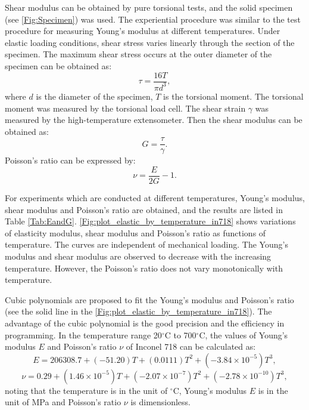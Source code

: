Shear modulus can be obtained by pure torsional tests, and the solid specimen (see \ref{Fig:Specimen}) was used.
The experiential procedure was similar to the test procedure for measuring Young's modulus at different temperatures.
Under elastic loading conditions, shear stress varies linearly through the section of the specimen.
The maximum shear stress occurs at the outer diameter of the specimen can be obtained as:
\begin{equation}
\tau=\frac{{16T}}{\pi d^3},
\end{equation}
where $d$ is the diameter of the specimen, $T$ is the torsional moment.
The torsional moment was measured by the torsional load cell.
The shear strain $\gamma$ was measured by the high-temperature extensometer.
Then the shear modulus can be obtained as:
\begin{equation}
G=\frac{\tau}{\gamma}.
\end{equation}
Poisson's ratio can be expressed by:
\begin{equation}
\nu  = \frac{E}{{2G}} - 1.
\end{equation}

For experiments which are conducted at different temperatures, Young's modulus, shear modulus and Poisson's ratio are obtained, and the results are listed in Table \ref{Tab:EandG}.
\ref{Fig:plot_elastic_by_temperature_in718} shows variations of elasticity modulus, shear modulus and Poisson's ratio as functions of temperature. The curves are independent of mechanical loading. The Young's modulus and shear modulus are observed to decrease with the increasing temperature. However, the Poisson's ratio does not vary monotonically with temperature.

Cubic polynomials are proposed to fit the Young's modulus and Poisson's ratio (see the solid line in the \ref{Fig:plot_elastic_by_temperature_in718}).
The advantage of the cubic polynomial is the good precision and the efficiency in programming.
In the temperature range 20$^{\circ}$C to 700$^{\circ}$C, the values of Young's modulus $E$ and Poisson's ratio $\nu$ of Inconel 718 can be calculated as:
\begin{equation}
E=206308.7+(-51.20)T+(0.0111)T^2+(-3.84\times10^{-5})T^3,
\label{Equ:polynomial_of_E}
\end{equation}
\begin{equation}
\nu=0.29+(1.46\times10^{-5})T+(-2.07\times10^{-7})T^2+(-2.78\times10^{-10})T^3,
\label{Equ:polynomial_of_nu}
\end{equation}
noting that the temperature is in the unit of $^\circ$C, Young's modulus $E$ is in the unit of MPa and Poisson's ratio $\nu$ is dimensionless.

